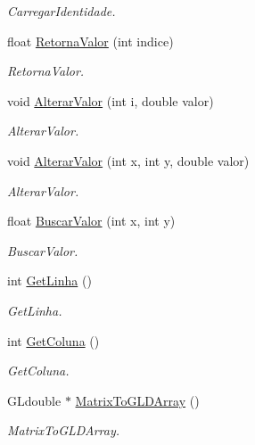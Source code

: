 \begin{DoxyCompactItemize}
\begin{DoxyCompactList}\small\item\em Carregar\+Identidade. \end{DoxyCompactList}\item 
float \hyperlink{class_matriz_a1b1d243308d2abe0c4a006290080d1ca}{Retorna\+Valor} (int indice)
\begin{DoxyCompactList}\small\item\em Retorna\+Valor. \end{DoxyCompactList}\item 
void \hyperlink{class_matriz_a8c314e508d6c1e914934d5f1ef2de1ef}{Alterar\+Valor} (int i, double valor)
\begin{DoxyCompactList}\small\item\em Alterar\+Valor. \end{DoxyCompactList}\item 
void \hyperlink{class_matriz_a8f69fad47da1df40be3f448395c718cf}{Alterar\+Valor} (int x, int y, double valor)
\begin{DoxyCompactList}\small\item\em Alterar\+Valor. \end{DoxyCompactList}\item 
float \hyperlink{class_matriz_aee54b8e25924456f4edc7bf10146d877}{Buscar\+Valor} (int x, int y)
\begin{DoxyCompactList}\small\item\em Buscar\+Valor. \end{DoxyCompactList}\item 
int \hyperlink{class_matriz_a7e9924501f170446e0142a1fccf991a8}{Get\+Linha} ()
\begin{DoxyCompactList}\small\item\em Get\+Linha. \end{DoxyCompactList}\item 
int \hyperlink{class_matriz_acb08d38a62492a116456d5d2a14c7b04}{Get\+Coluna} ()
\begin{DoxyCompactList}\small\item\em Get\+Coluna. \end{DoxyCompactList}\item 
G\+Ldouble $\ast$ \hyperlink{class_matriz_aad5c44bfa49cbe5221cee329a37303f9}{Matrix\+To\+G\+L\+D\+Array} ()
\begin{DoxyCompactList}\small\item\em Matrix\+To\+G\+L\+D\+Array. \end{DoxyCompactList}\end{DoxyCompactItemize}
